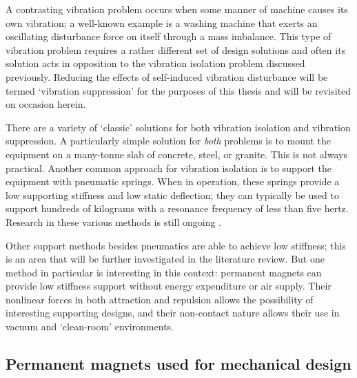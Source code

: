 \documentclass[11pt,a4paper]{memoir}
\begin{document}
A contrasting vibration problem occurs when some manner of machine causes its own vibration; a well-known example is a washing machine that exerts an oscillating disturbance force on itself through a mass imbalance.
This type of vibration problem requires a rather different set of design solutions and often its solution acts in opposition to the vibration isolation problem discussed previously.
Reducing the effects of self-induced vibration disturbance will be termed `vibration suppression'
for the purposes of this thesis and will be revisited on occasion herein.

There are a variety of `classic' solutions for both vibration isolation and vibration suppression.
A particularly simple solution for \emph{both} problems is to mount the equipment on a many-tonne slab of concrete, steel, or granite.
This is not always practical.
Another common approach for vibration isolation is to support the equipment with pneumatic springs.
When in operation, these springs provide a low supporting stiffness and low static deflection; they can typically be used to support hundreds of kilograms with a resonance frequency of less than five hertz.
Research in these various methods is still ongoing \cite{yoshioka2001,chen2007,kawashima2007,hong2010-rsi}.

Other support methods besides pneumatics are able to achieve low stiffness; this is an area that will be further investigated in the literature review.
But one method in particular is interesting in this context: permanent magnets can provide low stiffness support without energy expenditure or air supply.
Their nonlinear forces in both attraction and repulsion allows the possibility of interesting supporting designs, and their non-contact nature allows their use in vacuum and `clean-room' environments.


\subsection{Permanent magnets used for mechanical design}
\end{document}
